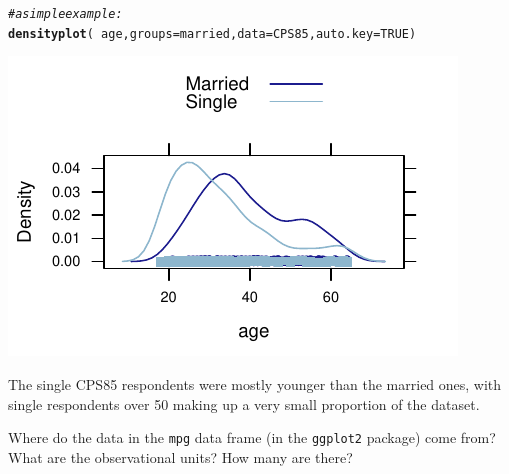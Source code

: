 \documentclass[twoside]{book}\usepackage[]{graphicx}\usepackage[]{xcolor}
\makeatletter
\def\maxwidth{ %
  \ifdim\Gin@nat@width>\linewidth
    \linewidth
  \else
    \Gin@nat@width
  \fi
}
\newcommand{\hlnum}[1]{\textcolor[rgb]{0.686,0.059,0.569}{#1}}%
\newcommand{\hlcom}[1]{\textcolor[rgb]{0.678,0.584,0.686}{\textit{#1}}}%
\newcommand{\hlopt}[1]{\textcolor[rgb]{0,0,0}{#1}}%
\newcommand{\hlstd}[1]{\textcolor[rgb]{0.345,0.345,0.345}{#1}}%
\newcommand{\hlkwc}[1]{\textcolor[rgb]{0.333,0.667,0.333}{#1}}%
\newcommand{\hlkwd}[1]{\textcolor[rgb]{0.737,0.353,0.396}{\textbf{#1}}}%
\newenvironment{kframe}{%
 \def\at@end@of@kframe{}%
 \ifinner\ifhmode%
  \def\at@end@of@kframe{\end{minipage}}%
  \begin{minipage}{\columnwidth}%
 \fi\fi%
 \def\FrameCommand##1{\hskip\@totalleftmargin \hskip-\fboxsep
 \colorbox{shadecolor}{##1}\hskip-\fboxsep
     \hskip-\linewidth \hskip-\@totalleftmargin \hskip\columnwidth}%
 \MakeFramed {\advance\hsize-\width
   \@totalleftmargin\z@ \linewidth\hsize
   \@setminipage}}%
 {\par\unskip\endMakeFramed%
 \at@end@of@kframe}
\newenvironment{knitrout}{}{} %
\newcommand{\Rindex}[1]{\index{\texttt{#1}}}
\newcommand{\dataframe}[1]{{\color{blue!80!black}\texttt{#1}}\Rindex{#1}}
\newcommand{\pkg}[1]{{\color{red!80!black}\texttt{#1}}\Rindex{#1}}
\newcounter{example}[section]
\makeatother
\begin{document}
\begin{solution}
\begin{knitrout}
\color{fgcolor}\begin{kframe}
\begin{alltt}
\hlcom{# a simple example:}
\hlkwd{densityplot}\hlstd{(}\hlopt{~}\hlstd{age,} \hlkwc{groups} \hlstd{= married,} \hlkwc{data} \hlstd{= CPS85,} \hlkwc{auto.key} \hlstd{=} \hlnum{TRUE}\hlstd{)}
\end{alltt}
\end{kframe}

{\centering \includegraphics[width=\maxwidth]{figures/fig-unnamed-chunk-24-1} 

}



\end{knitrout}
The single CPS85 respondents were mostly younger than the married ones, with single respondents over 50 making up a very small proportion of the dataset. 
\end{solution}

\begin{problem}
	Where do the data in the \dataframe{mpg} data frame (in the 
	\pkg{ggplot2} package) come from?  What are the observational 
	units?  How many are there?
\end{problem}
\end{document}
